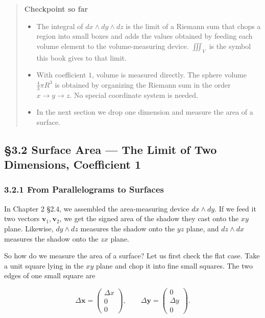\documentclass[a4paper,12pt,openany]{book}
\begin{document}
\begin{quote}
\textbf{Checkpoint so far}

\begin{itemize}
\item
  The integral of \(dx \wedge dy \wedge dz\) is the limit of a Riemann
  sum that chops a region into small boxes and adds the values obtained
  by feeding each volume element to the volume-measuring device.
  \(\iiint_V\) is the symbol this book gives to that limit.
\item
  With coefficient \(1\), volume is measured directly. The sphere volume
  \(\frac{4}{3}\pi R^3\) is obtained by organizing the Riemann sum in
  the order \(x \to y \to z\). No special coordinate system is needed.
\item
  In the next section we drop one dimension and measure the area of a
  surface.
\end{itemize}
\end{quote}

\par\vspace{0.35em}\par

\hypertarget{surface-area-the-limit-of-two-dimensions-coefficient-1}{%
\subsection{§3.2 Surface Area — The Limit of Two Dimensions,
Coefficient
1}\label{surface-area-the-limit-of-two-dimensions-coefficient-1}}

\hypertarget{from-parallelograms-to-surfaces}{%
\subsubsection{3.2.1 From Parallelograms to
Surfaces}\label{from-parallelograms-to-surfaces}}

In Chapter 2 §2.4, we assembled the area-measuring device
\(dx \wedge dy\). If we feed it two vectors
\(\mathbf{v}_1, \mathbf{v}_2\), we get the signed area of the shadow
they cast onto the \(xy\) plane. Likewise, \(dy \wedge dz\) measures the
shadow onto the \(yz\) plane, and \(dz \wedge dx\) measures the shadow
onto the \(zx\) plane.

So how do we measure the area of a surface? Let us first check the flat
case. Take a unit square lying in the \(xy\) plane and chop it into fine
small squares. The two edges of one small square are

\[\Delta\mathbf{x}=\begin{pmatrix}\Delta x\\0\\0\end{pmatrix},\qquad
\Delta\mathbf{y}=\begin{pmatrix}0\\\Delta y\\0\end{pmatrix}.\]
\end{document}
